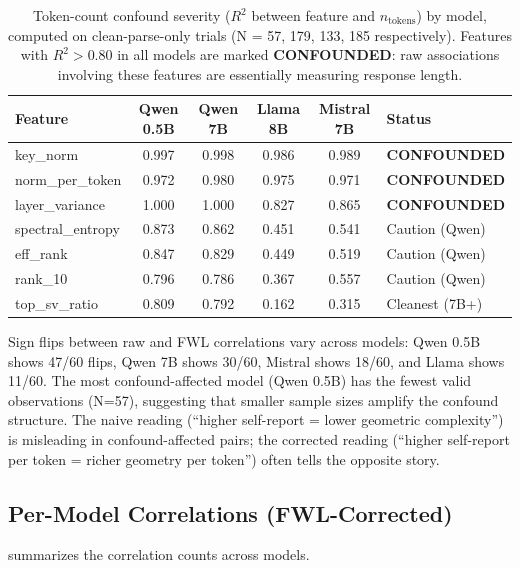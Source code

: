 \documentclass[11pt,a4paper]{article}
\begin{document}
\begin{table}[H]
\centering
\caption{Token-count confound severity ($R^2$ between feature and $n_{\text{tokens}}$) by model, computed on clean-parse-only trials (N = 57, 179, 133, 185 respectively). Features with $R^2 > 0.80$ in all models are marked \textbf{CONFOUNDED}: raw associations involving these features are essentially measuring response length.}
\label{tab:confound_r2}
\begin{tabular}{lccccl}
\toprule
\textbf{Feature} & \textbf{Qwen 0.5B} & \textbf{Qwen 7B} & \textbf{Llama 8B} & \textbf{Mistral 7B} & \textbf{Status} \\
\midrule
key\_norm          & 0.997 & 0.998 & 0.986 & 0.989 & \textbf{CONFOUNDED} \\
norm\_per\_token   & 0.972 & 0.980 & 0.975 & 0.971 & \textbf{CONFOUNDED} \\
layer\_variance    & 1.000 & 1.000 & 0.827 & 0.865 & \textbf{CONFOUNDED} \\
spectral\_entropy  & 0.873 & 0.862 & 0.451 & 0.541 & Caution (Qwen) \\
eff\_rank          & 0.847 & 0.829 & 0.449 & 0.519 & Caution (Qwen) \\
rank\_10           & 0.796 & 0.786 & 0.367 & 0.557 & Caution (Qwen) \\
top\_sv\_ratio     & 0.809 & 0.792 & 0.162 & 0.315 & Cleanest (7B+) \\
\bottomrule
\end{tabular}
\end{table}

Sign flips between raw and FWL correlations vary across models: Qwen 0.5B shows 47/60 flips, Qwen 7B shows 30/60, Mistral shows 18/60, and Llama shows 11/60. The most confound-affected model (Qwen 0.5B) has the fewest valid observations (N=57), suggesting that smaller sample sizes amplify the confound structure. The naive reading (``higher self-report = lower geometric complexity'') is misleading in confound-affected pairs; the corrected reading (``higher self-report per token = richer geometry per token'') often tells the opposite story.

\subsection{Per-Model Correlations (FWL-Corrected)}

 summarizes the correlation counts across models.
\end{document}
